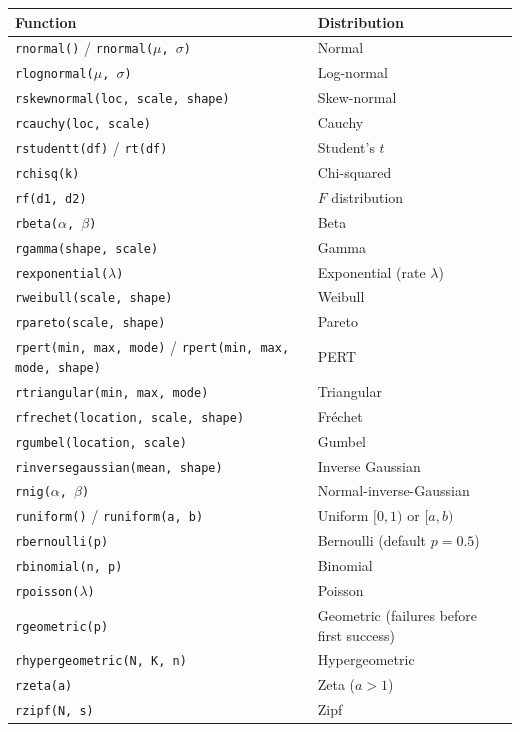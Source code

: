 \begin{center}
\begin{tabular}{ll}
\toprule
\textbf{Function} & \textbf{Distribution} \\
\midrule
\texttt{rnormal()} / \texttt{rnormal($\mu$, $\sigma$)} & Normal \\
\texttt{rlognormal($\mu$, $\sigma$)} & Log-normal \\
\texttt{rskewnormal(loc, scale, shape)} & Skew-normal \\
\texttt{rcauchy(loc, scale)} & Cauchy \\
\texttt{rstudentt(df)} / \texttt{rt(df)} & Student's $t$ \\
\texttt{rchisq(k)} & Chi-squared \\
\texttt{rf(d1, d2)} & $F$ distribution \\
\texttt{rbeta($\alpha$, $\beta$)} & Beta \\
\texttt{rgamma(shape, scale)} & Gamma \\
\texttt{rexponential($\lambda$)} & Exponential (rate $\lambda$) \\
\texttt{rweibull(scale, shape)} & Weibull \\
\texttt{rpareto(scale, shape)} & Pareto \\
\texttt{rpert(min, max, mode)} / \texttt{rpert(min, max, mode, shape)} & PERT \\
\texttt{rtriangular(min, max, mode)} & Triangular \\
\texttt{rfrechet(location, scale, shape)} & Fr\'{e}chet \\
\texttt{rgumbel(location, scale)} & Gumbel \\
\texttt{rinversegaussian(mean, shape)} & Inverse Gaussian \\
\texttt{rnig($\alpha$, $\beta$)} & Normal-inverse-Gaussian \\
\texttt{runiform()} / \texttt{runiform(a, b)} & Uniform $[0,1)$ or $[a,b)$ \\
\midrule
\texttt{rbernoulli(p)} & Bernoulli (default $p=0.5$) \\
\texttt{rbinomial(n, p)} & Binomial \\
\texttt{rpoisson($\lambda$)} & Poisson \\
\texttt{rgeometric(p)} & Geometric (failures before first success) \\
\texttt{rhypergeometric(N, K, n)} & Hypergeometric \\
\texttt{rzeta(a)} & Zeta ($a>1$) \\
\texttt{rzipf(N, s)} & Zipf \\
\bottomrule
\end{tabular}
\end{center}

